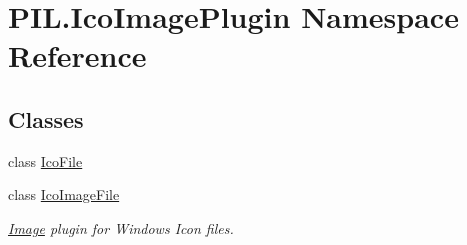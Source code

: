 \hypertarget{namespacePIL_1_1IcoImagePlugin}{}\section{P\+I\+L.\+Ico\+Image\+Plugin Namespace Reference}
\label{namespacePIL_1_1IcoImagePlugin}
\subsection*{Classes}
\begin{DoxyCompactItemize}
\item 
class \hyperlink{classPIL_1_1IcoImagePlugin_1_1IcoFile}{Ico\+File}
\item 
class \hyperlink{classPIL_1_1IcoImagePlugin_1_1IcoImageFile}{Ico\+Image\+File}
\begin{DoxyCompactList}\small\item\em \hyperlink{namespacePIL_1_1Image}{Image} plugin for Windows Icon files. \end{DoxyCompactList}\end{DoxyCompactItemize}
